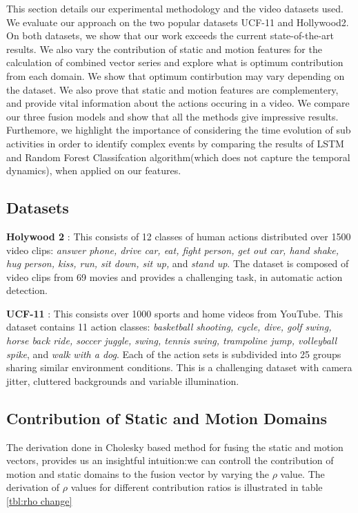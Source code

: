 This section details our experimental methodology and the  video  datasets used. We evaluate our approach on the two popular datasets
UCF-11 and Hollywood2. On both datasets, we show that our work exceeds the current state-of-the-art
results. We also vary the contribution of static and motion features for the calculation
of combined vector series and explore what is optimum contribution from each domain. We show that optimum contirbution
may vary depending on the dataset. We also prove that static and motion features
are complementery, and provide vital information about the actions occuring in a video. We compare our three fusion models and show that
all the methods give impressive results. Furthemore, we highlight the importance of considering the time evolution
of sub activities in order to identify complex events by comparing the results of LSTM and Random Forest Classifcation algorithm(which does not capture
the temporal dynamics), when applied on our features. 

\subsection{Datasets}
\noindent
\textbf{Holywood 2} \cite{marszalek2009actions}: This consists of 12 classes of human actions distributed over 1500 video clips:
\textit{answer phone, drive car, eat, fight person, get out car, hand shake, 
hug person, kiss, run, sit down, sit up, }and \textit{stand up}.
The dataset is composed of video clips from 69 movies and provides a challenging task, in automatic action detection.

\noindent
\textbf{UCF-11} \cite{liu2009recognizing}: This consists over 1000
sports and home videos from YouTube. This dataset contains 11 action classes: 
\textit{basketball shooting, cycle, dive, golf swing, horse
back ride, soccer juggle, swing, tennis swing, trampoline
jump, volleyball spike}, and \textit{walk with a dog}. Each of the action 
sets is subdivided into 25 groups sharing similar environment conditions. 
This is a challenging dataset with
camera jitter, cluttered backgrounds and variable illumination. 


\subsection{Contribution of Static and Motion Domains}

The derivation done in Cholesky based method for fusing the static and motion vectors,
provides us an insightful intuition:we can controll the contribution
of motion and static domains to the fusion vector by varying the $\rho$ value. 
The derivation of $\rho$ values for different contribution ratios is illustrated in 
table \ref{tbl:rho change}

